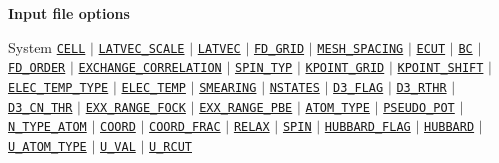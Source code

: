   
  
  \begin{frame}[allowframebreaks]{\textbf{Input file options}} \label{Index}
  \vspace{-2mm}
  \begin{block}{System}
  \hyperlink{CELL}{\texttt{CELL}} $\vert$
  \hyperlink{LATVEC_SCALE}{\texttt{LATVEC\_SCALE}} $\vert$
  \hyperlink{LATVEC}{\texttt{LATVEC}}  $\vert$
  \hyperlink{FD_GRID}{\texttt{FD\_GRID}} $\vert$
  \hyperlink{MESH_SPACING}{\texttt{MESH\_SPACING}} $\vert$
  \hyperlink{ECUT}{\texttt{ECUT}} $\vert$
  \hyperlink{BC}{\texttt{BC}} $\vert$
  \hyperlink{FD_ORDER}{\texttt{FD\_ORDER}} $\vert$
  \hyperlink{EXCHANGE_CORRELATION}{\texttt{EXCHANGE\_CORRELATION}} $\vert$
  \hyperlink{SPIN_TYP}{\texttt{SPIN\_TYP}} $\vert$
  \hyperlink{KPOINT_GRID}{\texttt{KPOINT\_GRID}} $\vert$
  \hyperlink{KPOINT_SHIFT}{\texttt{KPOINT\_SHIFT}} $\vert$
  \hyperlink{ELEC_TEMP_TYPE}{\texttt{ELEC\_TEMP\_TYPE}} $\vert$
  \hyperlink{ELEC_TEMP}{\texttt{ELEC\_TEMP}} $\vert$
  \hyperlink{SMEARING}{\texttt{SMEARING}} $\vert$
  \hyperlink{NSTATES}{\texttt{NSTATES}}     $\vert$
  \hyperlink{D3_FLAG}{\texttt{D3\_FLAG}} $\vert$
  \hyperlink{D3_RTHR}{\texttt{D3\_RTHR}} $\vert$
  \hyperlink{D3_CN_THR}{\texttt{D3\_CN\_THR}} $\vert$
  \hyperlink{EXX_RANGE_FOCK}{\texttt{EXX\_RANGE\_FOCK}} $\vert$ 
  \hyperlink{EXX_RANGE_PBE}{\texttt{EXX\_RANGE\_PBE}} $\vert$ 
  \hyperlink{ATOM_TYPE}{\texttt{ATOM\_TYPE}} $\vert$
  \hyperlink{PSEUDO_POT}{\texttt{PSEUDO\_POT}}  $\vert$
  \hyperlink{N_TYPE_ATOM}{\texttt{N\_TYPE\_ATOM}} $\vert$
  \hyperlink{COORD}{\texttt{COORD}} $\vert$
  \hyperlink{COORD_FRAC}{\texttt{COORD\_FRAC}} $\vert$
  \hyperlink{RELAX}{\texttt{RELAX}} $\vert$
  \hyperlink{SPIN}{\texttt{SPIN}} $\vert$
  \hyperlink{HUBBARD_FLAG}{\texttt{HUBBARD\_FLAG}} $\vert$
  \hyperlink{HUBBARD}{\texttt{HUBBARD}} $\vert$
  \hyperlink{U_ATOM_TYPE}{\texttt{U\_ATOM\_TYPE}} $\vert$
  \hyperlink{U_VAL}{\texttt{U\_VAL}} $\vert$
  \hyperlink{U_RCUT}{\texttt{U\_RCUT}}
  \end{block}
  

\end{frame}

